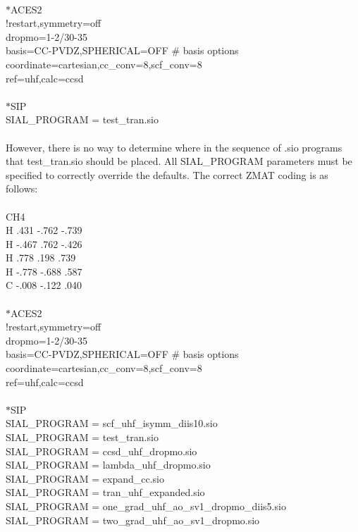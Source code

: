 \documentclass[12pt]{article}
\begin{document}
\\
$*$ACES2\\
!restart,symmetry=off\\ 
dropmo=1-2/30-35\\
basis=CC-PVDZ,SPHERICAL=OFF \# basis options\\ 
coordinate=cartesian,cc\_conv=8,scf\_conv=8\\ 
ref=uhf,calc=ccsd\\ 
\\
$*$SIP\\ 
SIAL\_PROGRAM = test\_tran.sio\\ 
\\
However, there is no way to determine where in the sequence of .sio programs that 
test\_tran.sio should be placed. All SIAL\_PROGRAM parameters must be specified to correctly 
override the defaults. The correct ZMAT coding is as follows:\\ 
\\ 
CH4\\ 
H    .431     -.762     -.739\\ 
H   -.467      .762     -.426\\
H    .778      .198      .739\\ 
H   -.778     -.688      .587\\
C   -.008     -.122      .040\\ 
\\
$*$ACES2\\ 
!restart,symmetry=off\\ 
dropmo=1-2/30-35\\ 
basis=CC-PVDZ,SPHERICAL=OFF \# basis options\\ 
coordinate=cartesian,cc\_conv=8,scf\_conv=8\\
ref=uhf,calc=ccsd\\ 
\\
$*$SIP\\  
SIAL\_PROGRAM = scf\_uhf\_isymm\_diis10.sio\\
SIAL\_PROGRAM = test\_tran.sio\\
SIAL\_PROGRAM = ccsd\_uhf\_dropmo.sio\\
SIAL\_PROGRAM = lambda\_uhf\_dropmo.sio\\
SIAL\_PROGRAM = expand\_cc.sio\\
SIAL\_PROGRAM = tran\_uhf\_expanded.sio\\
SIAL\_PROGRAM = one\_grad\_uhf\_ao\_sv1\_dropmo\_diis5.sio\\
SIAL\_PROGRAM = two\_grad\_uhf\_ao\_sv1\_dropmo.sio\\
\end{document}
